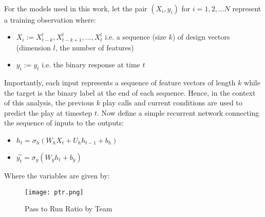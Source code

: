 \documentclass[11pt]{article}
\begin{document}
\begin{multicols*}{2}
                \paragraph{}
                    For the models used in this work, let the pair $(X_i, y_i)$ for $i = 1,2,...N$ represent a training observation where:
                    
                    \begin{itemize}
                        \item $X_i := X_{t-k}^l, X_{t-k+1}^l, ... , X_{t}^l$ i.e. a sequence (size $k$) of design vectors (dimension $l$, the number of features)  
                        \item $y_i := y_{t}$ i.e. the binary response at time $t$ 
                    \end{itemize}

                    Importantly, each input represents a sequence of feature vectors of length $k$ while the target is the binary label at the end of each sequence. 
                    Hence, in the context of this analysis, the previous $k$ play calls and current conditions are used to predict the play at timestep $t$. 
                    Now define a simple recurrent network connecting the sequence of inputs to the outputs:

                    \begin{itemize}
                        \item $h_t = \sigma_{h}(W_{h}X_{t} + U_{h}h_{t-1} + b_{h})$ 
                        \item $\hat{y_t} = \sigma_{y}(W_{y}h_{t} + b_{y})$ 
                    \end{itemize}

                    Where the variables are given by:



            \end{multicols*}
            \begin{figure}[ht]
                \texttt{[image: ptr.png]}
                \caption{Pass to Run Ratio by Team}
                \label{fig:Pass to Run Ratio by Team}
            \end{figure}
\end{document}
